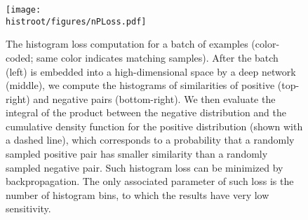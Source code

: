
\begin{figure}
    \centering
    \texttt{[image: \\histroot/figures/nPLoss.pdf]}
    \caption{The histogram loss computation for a batch of examples 
    (color-coded; same color indicates matching samples). After the batch (left) is embedded into a high-dimensional space by a deep network (middle), we compute the histograms of similarities of positive (top-right) and negative pairs (bottom-right). We then evaluate the integral of the product between the negative distribution and the cumulative density function for the positive distribution (shown with a dashed line), which corresponds to a probability that a randomly sampled positive pair has smaller similarity than a randomly sampled negative pair. Such histogram loss can be minimized by backpropagation. The only associated parameter of such loss is the number of histogram bins, to which the results have very low sensitivity.}
    \label{fig:scheme}
\end{figure}


